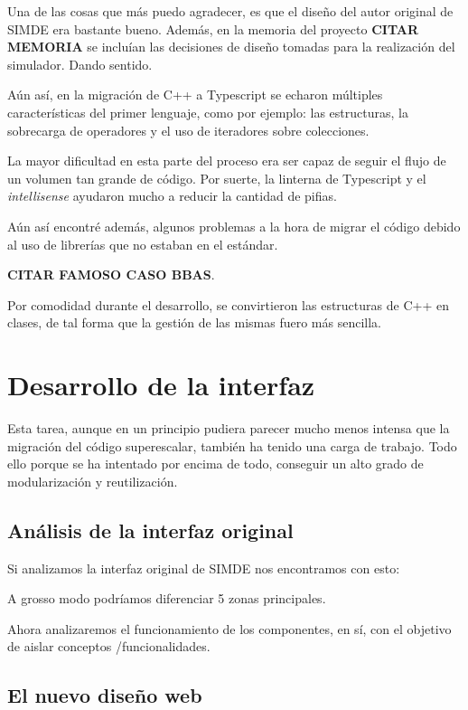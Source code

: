 Una de las cosas que más puedo agradecer, es que el diseño del autor original de SIMDE era bastante 
bueno. Además, en la memoria del proyecto \textbf{CITAR MEMORIA} se incluían las decisiones de diseño
tomadas para la realización del simulador. Dando sentido.

\bigskip
Aún así, en la migración de C++ a Typescript se echaron múltiples características del primer lenguaje,
como por ejemplo: las estructuras,  la sobrecarga de operadores y el uso de iteradores sobre colecciones.

\bigskip
La mayor dificultad en esta parte del proceso era ser capaz de seguir el flujo de un volumen tan grande
de código. Por suerte, la linterna de Typescript y el \textit{intellisense} ayudaron mucho a reducir la cantidad
de pifias.

\bigskip
Aún así encontré además, algunos problemas a la hora de migrar el código debido al uso de librerías 
que no estaban en el estándar.

\textbf{CITAR FAMOSO CASO BBAS}.

\bigskip
Por comodidad durante el desarrollo, se convirtieron las estructuras de C++ en clases, de tal forma
que la gestión de las mismas fuero más sencilla.

\section{Desarrollo de la interfaz}
\label{5:sec3} 

Esta tarea, aunque en un principio pudiera parecer mucho menos intensa que la migración del código 
superescalar, también ha tenido una carga de trabajo. Todo ello porque se ha intentado por encima 
de todo, conseguir un alto grado de modularización y reutilización. 

\subsection{Análisis de la interfaz original}

Si analizamos la interfaz original de SIMDE nos encontramos con esto: 

A grosso modo podríamos diferenciar 5 zonas principales.

Ahora analizaremos el funcionamiento de los componentes, en sí, con el objetivo de aislar conceptos
/funcionalidades.

\subsection{El nuevo diseño web}

